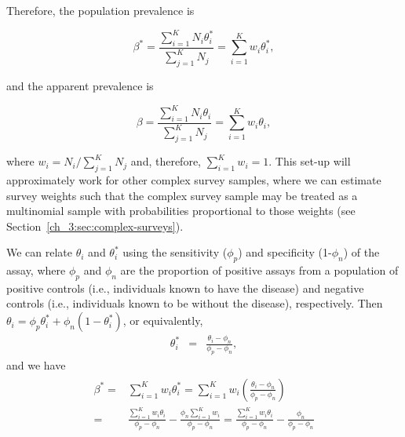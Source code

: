 Therefore, the population prevalence is

\begin{equation}
    \beta^* = \frac{\sum_{i=1}^K N_i \theta_i^*}{\sum_{j=1}^K N_j} = \sum_{i=1}^K w_i \theta_i^*,
    \label{ch_3:eq:pop-prev}
\end{equation}

and the apparent prevalence is

\begin{equation}
    \beta = \frac{\sum_{i=1}^K N_i \theta_i}{\sum_{j=1}^K N_j} = \sum_{i=1}^K w_i \theta_i,
    \label{ch_3:eq:app-prev}
\end{equation}

where \( w_i = N_i / \sum_{j=1}^K N_j \) and, therefore, \( \sum_{i=1}^K w_i = 1 \).
This set-up will approximately work for other complex survey samples, where we can estimate survey weights such that the complex survey sample may be treated as a multinomial sample with probabilities proportional to those weights (see Section~\ref{ch_3:sec:complex-surveys}).

We can relate $\theta_i$ and $\theta_i^*$ using the sensitivity ($\phi_p$) and specificity (1-$\phi_n$) of the assay,
where $\phi_p$ and $\phi_n$ are the proportion of positive assays from a population of positive controls (i.e., individuals known to have the disease) and
negative controls (i.e., individuals known to be without the disease), respectively. Then
$\theta_i = \phi_p \theta_i^* + \phi_n (1-\theta_i^*)$, or equivalently,\cite{Roga:1978}
\begin{eqnarray*}
\theta_i^* & = & \frac{ \theta_i - \phi_n }{\phi_p - \phi_n},
\end{eqnarray*}
and we have
\begin{align}
\begin{split}
  \beta^*   =&   \sum_{i=1}^K w_i \theta_i^*
            =  \sum_{i=1}^K w_i \left( \frac{\theta_i - \phi_n}{\phi_p - \phi_n} \right) \\
            =&   \frac{\sum_{i=1}^K w_i \theta_i}{\phi_p - \phi_n} - \frac{\phi_n \sum_{i=1}^K w_i}{\phi_p - \phi_n}
            =   \frac{\sum_{i=1}^K w_i \theta_i}{\phi_p - \phi_n} - \frac{\phi_n}{\phi_p - \phi_n}
            \label{ch_3:eq:long-beta}
\end{split}
\end{align}


